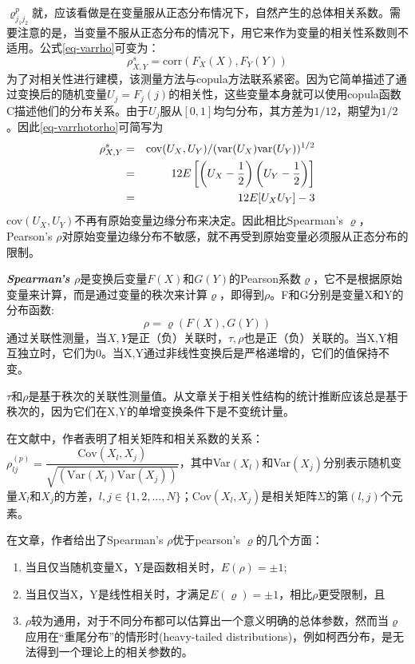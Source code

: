 $\varrho_{j_1 j_2}^{p}$就，应该看做是在变量服从正态分布情况下，自然产生的总体相关系数。需要注意的是，当变量不服从正态分布的情况下，用它来作为变量的相关性系数则不适用\cite{Smith2009}。公式\ref{eq-varrho}可变为：
\begin{equation}
    \rho_{X,Y}^s = \text{corr}(F_{X}(X),F_{Y}(Y))
    \label{eq-varrhotorho}
\end{equation}
为了对相关性进行建模，该测量方法与copula方法联系紧密。因为它简单描述了通过变换后的随机变量$U_j = F_j(j)$的相关性，这些变量本身就可以使用copula函数C描述他们的分布关系。\textcolor[rgb]{1,0,0}{由于$U_j$服从$[0,1]$均匀分布}，其方差为$1/12$，期望为$1/2$。因此\cref{eq-varrhotorho}可简写为
\begin{eqnarray}
    \rho_{X,Y}^s &=& \text{cov}(U_{X},U_{Y})/(\text{var}(U_{X})\text{var}(U_{Y}))^{1/2} \notag \\
    &=& 12E \left[ \left(U_{X} - \dfrac{1}{2}\right)\left(U_{Y} - \dfrac{1}{2}\right) \right] \notag \\
    &=& 12E [U_{X}U_{Y}] -3
    \label{eq-rhoSimplified}
\end{eqnarray}
cov$(U_X,U_Y)$不再有原始变量边缘分布来决定。因此相比Spearman's $\varrho$，Pearson's $\rho$对原始变量边缘分布不敏感，就不再受到原始变量必须服从正态分布的限制。



\emph{\textbf{\textcolor[rgb]{1,0,0}{Spearman's $\rho$}}}是变换后变量$F(X)$和$G(Y)$的Pearson系数$\varrho$\cite{Montes2015}，它不是根据原始变量来计算，而是通过变量的秩次来计算$\varrho$，即得到$\rho$。F和G分别是变量X和Y的分布函数:
\begin{equation}
    \label{eq-rho}
    \rho = \varrho(F(X),G(Y))
\end{equation}
通过关联性测量，当$X,Y$是正（负）关联时，$\tau,\rho$也是正（负）关联的。当X,Y相互独立时，它们为0。当X,Y通过非线性变换后是严格递增的，它们的值保持不变。

\textcolor[rgb]{1,0,0}{$\tau$和$\rho$是基于秩次的关联性测量值。从文章\cite{Genest2007}关于相关性结构的统计推断应该总是基于秩次的，因为它们在X,Y的单增变换条件下是不变统计量。}


在文献\cite{Deligiannis2012}中，作者表明了相关矩阵和相关系数的关系：$\rho_{lj}^{(p)} = \dfrac{\text{Cov}(X_l,X_j)}{\sqrt{\left(\text{Var}(X_l)\text{Var}(X_j)\right)}}$，其中Var$(X_l)$和Var$(X_j)$分别表示随机变量$X_l$和$X_j$的方差，$l,j \in \{1,2,\dots,N\}$；Cov$(X_l,X_j)$是相关矩阵$\Sigma$的第$(l,j)$个元素。

在文章\cite{Genest2007}，作者给出了Spearman's $\rho$优于pearson's $\varrho$的几个方面：
\begin{enumerate}[1.]
    \item 当且仅当随机变量X，Y是函数相关时，$E(\rho) = \pm 1$;
    \item 当且仅当X，Y是线性相关时，才满足$E(\varrho) = \pm 1$，相比$\rho$更受限制，且
    \item $\rho$较为通用，对于不同分布都可以估算出一个意义明确的总体参数，然而当$\varrho$应用在``重尾分布''的情形时(heavy-tailed distributions)，例如柯西分布，是无法得到一个理论上的相关参数的。
\end{enumerate}



